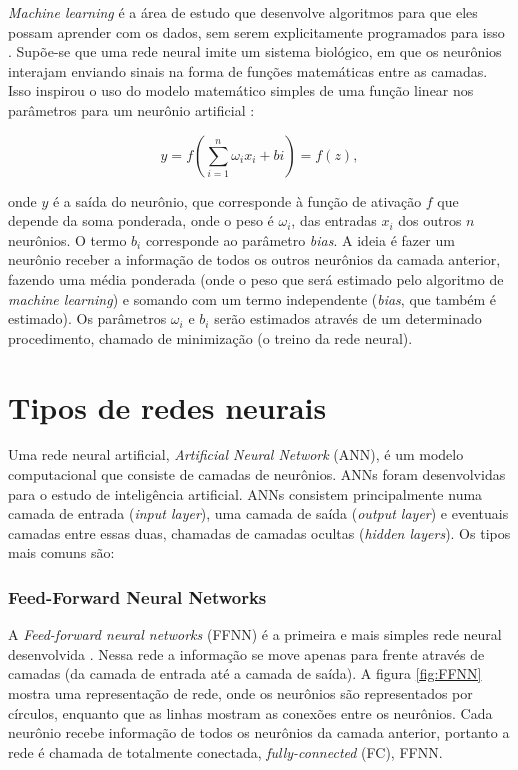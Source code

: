 \documentclass[a4paper,12pt,oneside]{book}
\begin{document}
\par \textit{Machine learning} é a área de estudo que desenvolve algoritmos para que eles possam aprender com os dados, sem serem explicitamente programados para isso \cite{mlbook}. Supõe-se que uma rede neural imite um sistema biológico, em que os neurônios interajam enviando sinais na forma de funções matemáticas entre as camadas. Isso inspirou o uso do modelo matemático simples de uma função linear nos parâmetros para um neurônio artificial \cite{curso}:

\begin{equation}\label{eq:model_n}
    y = f\left(\sum^{n}_{i = 1}\omega_i x_i + bi\right) = f(z),
\end{equation}

\par onde $y$ é a saída do neurônio, que corresponde à função de ativação $f$ que depende da soma ponderada, onde o peso é $\omega_i$, das entradas $x_i$ dos outros $n$ neurônios. O termo $b_i$ corresponde ao parâmetro \textit{bias}. A ideia é fazer um neurônio receber a informação de todos os outros neurônios da camada anterior, fazendo uma média ponderada (onde o peso que será estimado pelo algoritmo de \textit{machine learning}) e somando com um termo independente (\textit{bias}, que também é estimado). Os parâmetros $\omega_i$ e $b_i$ serão estimados através de um determinado procedimento, chamado de minimização (o treino da rede neural).

\section{Tipos de redes neurais}

\par Uma rede neural artificial, \textit{Artificial Neural Network} (ANN), é um modelo computacional que consiste de camadas de neurônios. ANNs foram desenvolvidas para o estudo de inteligência artificial\cite{mlbook, mldiverso}. ANNs consistem principalmente numa camada de entrada (\textit{input layer}), uma camada de saída (\textit{output layer}) e eventuais camadas entre essas duas, chamadas de camadas ocultas (\textit{hidden layers}). Os tipos mais comuns são:

\subsubsection*{Feed-Forward Neural Networks}

\par A \textit{Feed-forward neural networks} (FFNN) é a primeira e mais simples rede neural desenvolvida \cite{talent_ml, bishop2016pattern}. Nessa rede a informação se move apenas para frente através de camadas (da camada de entrada até a camada de saída). A figura \ref{fig:FFNN} mostra uma representação de rede, onde os neurônios são representados por círculos, enquanto que as linhas mostram as conexões entre os neurônios. Cada neurônio recebe informação de todos os neurônios da camada anterior, portanto a rede é chamada de totalmente conectada, \textit{fully-connected} (FC), FFNN. 
\end{document}
